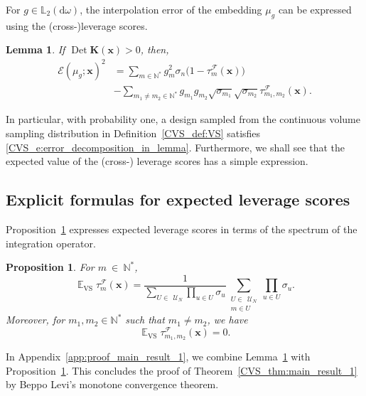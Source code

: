 \documentclass[twoside,11pt]{book}
\newtheorem{proposition}{Proposition}
\newtheorem{lemma}{Lemma}
\numberwithin{theorem}{chapter}
\numberwithin{definition}{chapter}
\numberwithin{proposition}{chapter}
\numberwithin{corollary}{chapter}
\numberwithin{example}{chapter}
\numberwithin{lemma}{chapter}
\numberwithin{assumption}{chapter}
\numberwithin{equation}{chapter}
\numberwithin{figure}{chapter}
\DeclareMathOperator{\Det}{Det}
\DeclareMathOperator{\VS}{\mathrm{VS}}
\DeclareMathOperator{\EX}{\mathbb{E}}
\DeclareMathOperator{\F}{\mathcal{F}}
\def\Ltwo{\mathbb{L}_{2}(\mathrm{d} \omega)}
\def\UN{\:\mathcal{U}_N}
\begin{document}
For $g \in \Ltwo$, the interpolation error of the embedding $\mu_{g}$ can be expressed using the (cross-)leverage scores.
\begin{lemma}\label{CVS_lemma:error_decomposition}
If $\Det \bm{K}(\bm{x}) > 0$, then,
\begin{align}
\label{CVS_e:error_decomposition_in_lemma}
\mathcal{E}(\mu_{g};\bm{x})^{2} & = \sum\limits_{m \in \mathbb{N}^{*}}  g_{m}^{2} \sigma_{n}\bigg(1- \tau_{m}^{\F}(\bm{x})\bigg)\\
 & - \sum\limits_{m_{1}\neq m_{2} \in \mathbb{N}^{*}}  g_{m_{1}}g_{m_{2}} \sqrt{\sigma_{m_{1}}} \sqrt{\sigma_{m_{2}}} \tau_{m_{1},m_{2}}^{\F}(\bm{x}). \nonumber
\end{align}
\end{lemma}
In particular, with probability one, a design sampled from the continuous volume sampling distribution in Definition~\ref{CVS_def:VS} satisfies \eqref{CVS_e:error_decomposition_in_lemma}. Furthermore, we shall see that the expected value of the (cross-) leverage scores has a simple expression.


\subsection{Explicit formulas for expected leverage scores}
\label{CVS_sec:closed_formulas}
Proposition~\ref{CVS_prop:EX_VS_lvs} expresses expected leverage scores in terms of the spectrum of the integration operator.
\begin{proposition}\label{CVS_prop:EX_VS_lvs}
For $m~\in~\mathbb{N}^{*}$,
\begin{equation}\label{CVS_eq:lvs_formula}
\EX_{\VS} \tau_{m}^{\F}(\bm{x})  = \frac{1}{\sum\limits_{U \in \: \UN} \prod\limits_{u \in U}\sigma_{u}}  \sum\limits_{\substack{U \in \: \UN \\ m \in U}} \prod\limits_{u \in U}\sigma_{u}.
\end{equation}
Moreover, for $m_{1},m_{2} \in \mathbb{N}^{*}$ such that $m_{1} \neq m_{2}$, we have
\begin{equation}\label{CVS_eq:cross_lvs_zero}
\EX_{\VS} \tau_{m_{1},m_{2}}^{\F}(\bm{x}) = 0.
\end{equation}
\end{proposition}

In Appendix~\ref{app:proof_main_result_1}, we combine Lemma~\ref{CVS_lemma:error_decomposition} with Proposition~\ref{CVS_prop:EX_VS_lvs}. This concludes the proof of Theorem~\ref{CVS_thm:main_result_1} by Beppo Levi's monotone convergence theorem.
\end{document}
